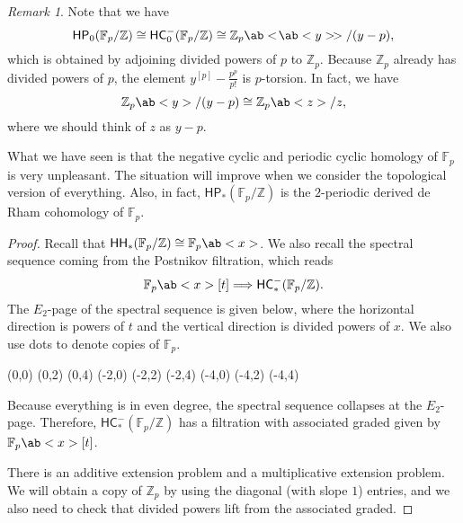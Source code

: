 \documentclass[10pt, oneside]{memoir}
\theoremstyle{definition}
\theoremstyle{remark}
\newtheorem{rmk}[thm]{Remark}
\theoremstyle{plain}
\theoremstyle{definition}
\theoremstyle{remark}
\newcommand{\Z}{\mathbb{Z}}
\newcommand{\F}{\mathbb{F}}
\newcommand{\ms}[1]{\mathsf{#1}}
\newcommand{\1}{\mathbf{1}}
\newcommand{\2}{\mathbf{2}}
\newcommand{\3}{\mathbf{3}}
\newcommand{\dps}[1]{\ab<\!\ab< #1 >\!>}
\newcommand{\HC}{\ms{HC}}
\newcommand{\HH}{\ms{HH}}
\newcommand{\HP}{\ms{HP}}
\begin{document}
\begin{rmk}
    Note that we have
    \[ \HP_0(\F_p/\Z) \cong \HC_0^-(\F_p/\Z) \cong \Z_p\dps{y}/(y-p), \]
    which is obtained by adjoining divided powers of $p$ to $\Z_p$. Because $\Z_p$ already has divided powers of $p$, the element $y^{[p]} - \frac{p^p}{p!}$ is $p$-torsion. In fact, we have
    \[ \Z_p \ab<y>/(y-p) \cong \Z_p \ab<z> / z, \]
    where we should think of $z$ as $y-p$.

    What we have seen is that the negative cyclic and periodic cyclic homology of $\F_p$ is very unpleasant. The situation will improve when we consider the topological version of everything. Also, in fact, $\HP_*(\F_p/\Z)$ is the $2$-periodic derived de Rham cohomology of $\F_p$.
\end{rmk}

\begin{proof}
    Recall that \(\HH_*(\F_p/\Z) \cong \F_p \ab<x>\). We also recall the spectral sequence coming from the Postnikov filtration, which reads
    \[ \F_p \ab<x>[t] \Longrightarrow \HC_*^-(\F_p / \Z). \]
    The $E_2$-page of the spectral sequence is given below, where the horizontal direction is powers of $t$ and the vertical direction is divided powers of $x$. We also use dots to denote copies of $\F_p$.
    \begin{center}
        \begin{sseqdata}[classes={draw=none}, name=omegas2, homological Serre
            grading, xscale=1, y axis gap = 2em, axes type = frame] 
            \class["\bullet"](0,0)
            \class["\bullet"](0,2) 
            \class["\bullet"](0,4) 
            \class["\bullet"](-2,0) 
            \class["\bullet"](-2,2) 
            \class["\bullet"](-2,4) 
            \class["\bullet"](-4,0) 
            \class["\bullet"](-4,2) 
            \class["\bullet"](-4,4)
        \end{sseqdata} 
        \printpage[name=omegas2, page=2] 
    \end{center} 
    Because everything is in even degree, the spectral sequence collapses at the $E_2$-page. Therefore, $\HC_*^-(\F_p/\Z)$ has a filtration with associated graded given by $\F_p\ab<x> [t]$.

    There is an additive extension problem and a multiplicative extension problem. We will obtain a copy of $\Z_p$ by using the diagonal (with slope $1$) entries, and we also need to check that divided powers lift from the associated graded.


\end{proof}
\end{document}
